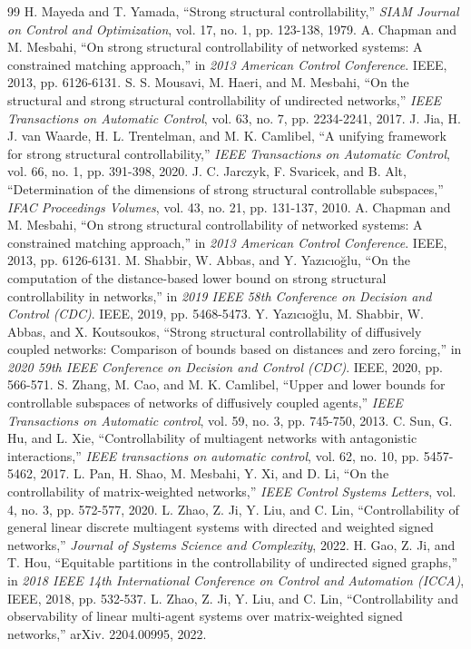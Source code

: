 \documentclass{IEEEtran}
\begin{document}
	\begin{thebibliography}{99}
		 H. Mayeda and T. Yamada, ``Strong structural controllability,'' \textit{SIAM Journal on Control and Optimization}, vol. 17, no. 1, pp. 123-138, 1979.
		 A. Chapman and M. Mesbahi, ``On strong structural controllability of networked systems: A constrained matching approach,'' in \textit{2013 American Control Conference}. IEEE, 2013, pp. 6126-6131.
		 S. S. Mousavi, M. Haeri, and M. Mesbahi, ``On the structural and strong structural controllability of undirected networks,'' \textit{IEEE Transactions on Automatic Control}, vol. 63, no. 7, pp. 2234-2241, 2017.
		 J. Jia, H. J. van Waarde, H. L. Trentelman, and M. K. Camlibel, ``A unifying framework for strong structural controllability,'' \textit{IEEE Transactions on Automatic Control}, vol. 66, no. 1, pp. 391-398, 2020.
		 J. C. Jarczyk, F. Svaricek, and B. Alt, ``Determination of the dimensions of strong structural controllable subspaces,'' \textit{IFAC Proceedings Volumes}, vol. 43, no. 21, pp. 131-137, 2010.
		 A. Chapman and M. Mesbahi, ``On strong structural controllability of networked systems: A constrained matching approach,'' in \textit{2013 American Control Conference}. IEEE, 2013, pp. 6126-6131.
		 M. Shabbir, W. Abbas, and Y. Yaz{\i}c{\i}o\u{g}lu, ``On the computation of the distance-based lower bound on strong structural controllability in networks,'' in \textit{2019 IEEE 58th Conference on Decision and Control (CDC)}. IEEE, 2019, pp. 5468-5473.
		 Y. Yaz{\i}c{\i}o\u{g}lu, M. Shabbir, W. Abbas, and X. Koutsoukos, ``Strong structural controllability of diffusively coupled networks: Comparison of bounds based on distances and zero forcing,'' in \textit{2020 59th IEEE Conference on Decision and Control (CDC)}. IEEE, 2020, pp. 566-571.
		 S. Zhang, M. Cao, and M. K. Camlibel, ``Upper and lower bounds for controllable subspaces of networks of diffusively coupled agents,'' \textit{IEEE Transactions on Automatic control}, vol. 59, no. 3, pp. 745-750, 2013.
		 C. Sun, G. Hu, and L. Xie, ``Controllability of multiagent networks with antagonistic interactions,'' \textit{IEEE transactions on automatic control}, vol. 62, no. 10, pp. 5457-5462, 2017.
		 L. Pan, H. Shao, M. Mesbahi, Y. Xi, and D. Li, ``On the controllability of matrix-weighted networks,'' \textit{IEEE Control Systems Letters}, vol. 4, no. 3, pp. 572-577, 2020.
		 L. Zhao, Z. Ji, Y. Liu, and C. Lin, ``Controllability of general linear discrete multiagent systems with directed and weighted signed networks,'' \textit{Journal of Systems Science and Complexity}, 2022.
		 H. Gao, Z. Ji, and T. Hou, ``Equitable partitions in the controllability of undirected signed graphs,'' in \textit{2018 IEEE 14th International Conference on Control and Automation (ICCA)}, IEEE, 2018, pp. 532-537.
		 L. Zhao, Z. Ji, Y. Liu, and C. Lin, ``Controllability and observability of linear multi-agent systems over matrix-weighted signed networks,'' arXiv. 2204.00995, 2022.
	\end{thebibliography}
\end{document}
